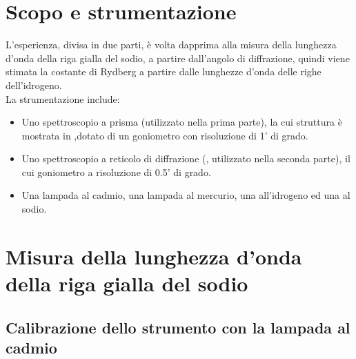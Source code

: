 \section{Scopo e strumentazione}

L'esperienza, divisa in due parti, è volta dapprima alla misura della lunghezza d'onda della riga gialla del sodio, a partire dall'angolo di diffrazione, quindi viene stimata la costante di Rydberg a partire dalle lunghezze d'onda delle righe dell'idrogeno.\\ La strumentazione include:
\begin{itemize} 
\item Uno spettroscopio a prisma (utilizzato nella prima parte), la cui struttura è mostrata in ,dotato di un goniometro con risoluzione di 1' di grado.
\item Uno spettroscopio a reticolo di diffrazione (, utilizzato nella seconda parte), il cui goniometro a risoluzione di 0.5' di grado.
\item Una lampada al cadmio, una lampada al mercurio, una all'idrogeno ed una al sodio.
\end{itemize}



\section{Misura della lunghezza d'onda della riga gialla del sodio}

\subsection{Calibrazione dello strumento con la lampada al cadmio}

